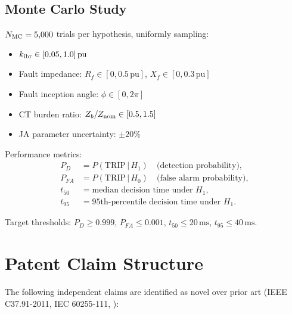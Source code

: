 \documentclass[11pt, a4paper]{article}
\newcommand{\pu}{\,\text{pu}}
\newcommand{\ms}{\,\text{ms}}
\begin{document}
\subsection{Monte Carlo Study}

$N_{\rm MC} = 5{,}000$ trials per hypothesis, uniformly sampling:
\begin{itemize}
  \item $k_{\rm ibr} \in [0.05, 1.0]\pu$
  \item Fault impedance: $R_f \in [0, 0.5\pu]$, $X_f \in [0, 0.3\pu]$
  \item Fault inception angle: $\phi \in [0, 2\pi]$
  \item CT burden ratio: $Z_b/Z_{\rm nom} \in [0.5, 1.5]$
  \item JA parameter uncertainty: $\pm 20\%$
\end{itemize}

Performance metrics:
\begin{align}
  P_D &= P(\text{TRIP}\,|\,H_1) \quad\text{(detection probability)}, \nonumber\\
  P_{FA} &= P(\text{TRIP}\,|\,H_0) \quad\text{(false alarm probability)}, \nonumber\\
  t_{50} &= \text{median decision time under }H_1, \nonumber\\
  t_{95} &= \text{95th-percentile decision time under }H_1.
\end{align}

Target thresholds: $P_D \geq 0.999$, $P_{FA} \leq 0.001$, $t_{50} \leq 20\ms$,
$t_{95} \leq 40\ms$.

\section{Patent Claim Structure}
\label{sec:patent}

The following independent claims are identified as novel over prior art
(IEEE C37.91-2011, IEC 60255-111, \cite{Kasztenny2010}):
\end{document}
